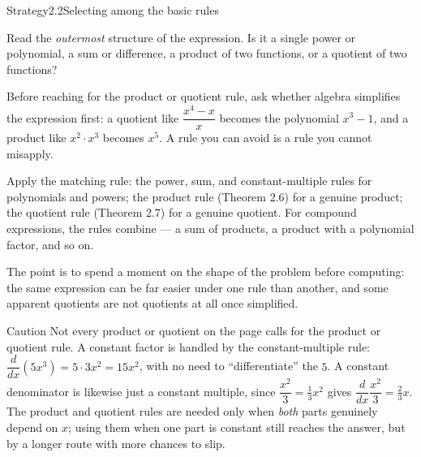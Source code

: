 \documentclass[a4paper,12pt,oneside]{memoir}
\begin{document}
\begin{envstrategy}{Strategy}{2.2}{Selecting among the basic rules}
\begin{steps}
  \item Read the \emph{outermost} structure of the expression. Is it a single power or polynomial, a sum or difference, a product of two functions, or a quotient of two functions?
  \item Before reaching for the product or quotient rule, ask whether algebra simplifies the expression first: a quotient like \(\dfrac{x^{4} - x}{x}\) becomes the polynomial \(x^{3} - 1\), and a product like \(x^{2}\cdot x^{3}\) becomes \(x^{5}\). A rule you can avoid is a rule you cannot misapply.
  \item Apply the matching rule: the power, sum, and constant-multiple rules for polynomials and powers; the product rule (Theorem 2.6) for a genuine product; the quotient rule (Theorem 2.7) for a genuine quotient. For compound expressions, the rules combine — a sum of products, a product with a polynomial factor, and so on.
\end{steps}
The point is to spend a moment on the shape of the problem before computing: the same expression can be far easier under one rule than another, and some apparent quotients are not quotients at all once simplified.
\end{envstrategy}
\begin{envcaution}{Caution}{}{}
Not every product or quotient on the page calls for the product or quotient rule. A constant factor is handled by the constant-multiple rule: \(\dfrac{d}{dx}(5x^{3}) = 5 \cdot 3x^{2} = 15x^{2}\), with no need to “differentiate” the \(5\). A constant denominator is likewise just a constant multiple, since \(\dfrac{x^{2}}{3} = \tfrac{1}{3}x^{2}\) gives \(\dfrac{d}{dx}\dfrac{x^{2}}{3} = \tfrac{2}{3}x\). The product and quotient rules are needed only when \emph{both} parts genuinely depend on \(x\); using them when one part is constant still reaches the answer, but by a longer route with more chances to slip.
\end{envcaution}
\end{document}
